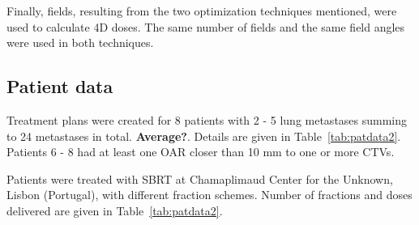 \documentclass[type=dr, dr=rernat, accentcolor=tud7b,colorbacktitle, bigchapter, openright, twoside, 12pt ]{tudthesis}
\begin{document}
Finally, fields, resulting from the two optimization techniques mentioned, were used to calculate 4D doses. The same number of fields and the same field angles were used in both techniques.

\subsection{Patient data}

Treatment plans were created for 8 patients with 2 - 5 lung metastases summing to 24 metastases in total. \textbf{Average?}. Details are given in Table~\ref{tab:patdata2}.
Patients 6 - 8 had at least one OAR closer than 10 mm to one or more CTVs. 

Patients were treated with SBRT at Chamaplimaud Center for the Unknown, Lisbon (Portugal), with different fraction schemes. Number of fractions and doses delivered are given in Table~\ref{tab:patdata2}. 
\end{document}
